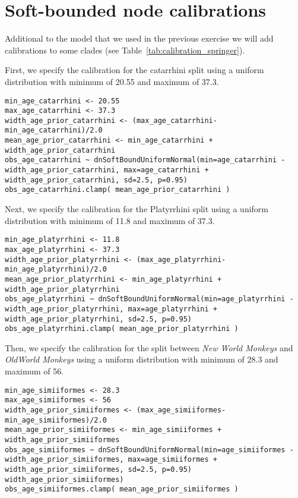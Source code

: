 \newpage
\section{Soft-bounded node calibrations}\label{sec:SoftBounds}
Additional to the model that we used in the previous exercise we will add calibrations to some clades (see Table~\ref{tab:calibration_springer}).

First, we specify the calibration for the catarrhini split using a uniform distribution with minimum of 20.55 and maximum of 37.3.
{\tt \begin{snugshade*}
\begin{lstlisting}
min_age_catarrhini <- 20.55
max_age_catarrhini <- 37.3
width_age_prior_catarrhini <- (max_age_catarrhini-min_age_catarrhini)/2.0
mean_age_prior_catarrhini <- min_age_catarrhini + width_age_prior_catarrhini
obs_age_catarrhini ~ dnSoftBoundUniformNormal(min=age_catarrhini - width_age_prior_catarrhini, max=age_catarrhini + width_age_prior_catarrhini, sd=2.5, p=0.95)
obs_age_catarrhini.clamp( mean_age_prior_catarrhini )
\end{lstlisting}
\end{snugshade*}}

Next, we specify the calibration for the Platyrrhini split using a uniform distribution with minimum of 11.8 and maximum of 37.3.
{\tt \begin{snugshade*}
\begin{lstlisting}
min_age_platyrrhini <- 11.8
max_age_platyrrhini <- 37.3
width_age_prior_platyrrhini <- (max_age_platyrrhini-min_age_platyrrhini)/2.0
mean_age_prior_platyrrhini <- min_age_platyrrhini + width_age_prior_platyrrhini
obs_age_platyrrhini ~ dnSoftBoundUniformNormal(min=age_platyrrhini - width_age_prior_platyrrhini, max=age_platyrrhini + width_age_prior_platyrrhini, sd=2.5, p=0.95)
obs_age_platyrrhini.clamp( mean_age_prior_platyrrhini )
\end{lstlisting}
\end{snugshade*}}

Then, we specify the calibration for the split between \emph{New World Monkeys} and \emph{OldWorld Monkeys} using a uniform distribution with minimum of 28.3 and maximum of 56.
{\tt \begin{snugshade*}
\begin{lstlisting}
min_age_simiiformes <- 28.3
max_age_simiiformes <- 56
width_age_prior_simiiformes <- (max_age_simiiformes-min_age_simiiformes)/2.0
mean_age_prior_simiiformes <- min_age_simiiformes + width_age_prior_simiiformes
obs_age_simiiformes ~ dnSoftBoundUniformNormal(min=age_simiiformes - width_age_prior_simiiformes, max=age_simiiformes + width_age_prior_simiiformes, sd=2.5, p=0.95)
width_age_prior_simiiformes)
obs_age_simiiformes.clamp( mean_age_prior_simiiformes )
\end{lstlisting}
\end{snugshade*}}

